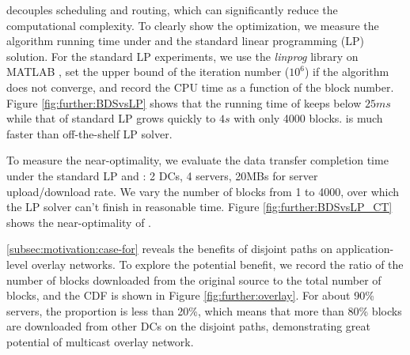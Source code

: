 \label{subsubsec:evaluation:depth}

 \name decouples scheduling and routing, which can significantly reduce the computational complexity. To clearly show the optimization, we measure the algorithm running time under \name and the standard linear programming (LP) solution. For the standard LP experiments, we use the \textit{linprog} library on MATLAB \cite{mathworks}, set the upper bound of the iteration number ($10^6$) if the algorithm does not converge, and record the CPU time as a function of the block number. Figure \ref{fig:further:BDSvsLP} shows that the running time of \name keeps below $25ms$ while that of standard LP grows quickly to $4s$ with only 4000 blocks. %
\name is much faster than off-the-shelf LP solver.

 To measure the near-optimality, we evaluate the data transfer completion time under the standard LP and \name: 2 DCs, 4 servers, 20MBs for server upload/download rate.
We vary the number of blocks from 1 to 4000, over which the LP solver can't finish in reasonable time. Figure \ref{fig:further:BDSvsLP_CT} shows the near-optimality of \name.%


 \Section\ref{subsec:motivation:case-for} reveals the benefits of disjoint paths on application-level overlay networks. To explore the potential benefit, we record the ratio of the number of blocks downloaded from the original source to the total number of blocks, and the CDF is shown in Figure \ref{fig:further:overlay}. For about 90\% servers, the proportion is less than 20\%, which means that more than 80\% blocks are downloaded from other DCs on the disjoint paths, demonstrating great potential of multicast overlay network.



